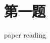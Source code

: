 \documentclass[12pt,a4paper]{article}
\begin{document}
\maketitle

\noindent
\setlength{\parindent}{2em}
\setlength{\parskip}{0.3em}
\linespread{1}

\section*{第一题}

paper reading~\cite{zhang2018comparison}



\end{document}
